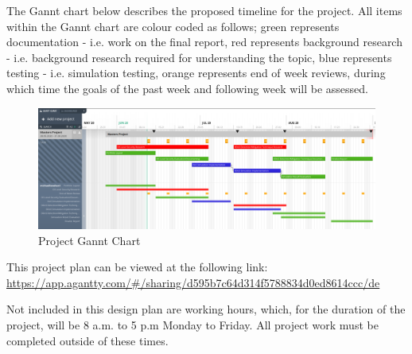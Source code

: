The Gannt chart below describes the proposed timeline for the project. All items
within the Gannt chart are colour coded as follows; green represents
documentation - i.e. work on the final report, red represents background
research - i.e. background research required for understanding the topic, blue
represents testing - i.e. simulation testing, orange represents end of week
reviews, during which time the goals of the past week and following week will be
assessed.

\begin{figure}[H]
	\centering
	\includegraphics[width=\textwidth]{images/GanntChart}
	\caption{Project Gannt Chart}
	\label{fig:images-GanntChart}
\end{figure}

This project plan can be viewed at the following link:
\url{https://app.agantty.com/#/sharing/d595b7c64d314f5788834d0ed8614ccc/de}

Not included in this design plan are working hours, which, for the duration of
the project, will be 8 a.m. to 5 p.m Monday to Friday. All project work must be completed outside
of these times.
